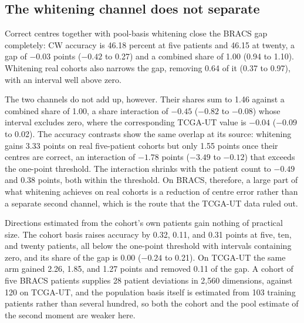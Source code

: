 \documentclass[11pt]{article}
\begin{document}
\subsection{The whitening channel does not separate}
\label{sec:whitening-results}
Correct centres together with pool-basis whitening close the BRACS gap completely: CW accuracy is 46.18 percent at five patients and 46.15 at twenty, a gap of $-0.03$ points ($-0.42$ to 0.27) and a combined share of 1.00 (0.94 to 1.10). Whitening real cohorts also narrows the gap, removing 0.64 of it (0.37 to 0.97), with an interval well above zero.

The two channels do not add up, however. Their shares sum to 1.46 against a combined share of 1.00, a share interaction of $-0.45$ ($-0.82$ to $-0.08$) whose interval excludes zero, where the corresponding TCGA-UT value is $-0.04$ ($-0.09$ to 0.02). The accuracy contrasts show the same overlap at its source: whitening gains 3.33 points on real five-patient cohorts but only 1.55 points once their centres are correct, an interaction of $-1.78$ points ($-3.49$ to $-0.12$) that exceeds the one-point threshold. The interaction shrinks with the patient count to $-0.49$ and 0.38 points, both within the threshold. On BRACS, therefore, a large part of what whitening achieves on real cohorts is a reduction of centre error rather than a separate second channel, which is the route that the TCGA-UT data ruled out.

Directions estimated from the cohort's own patients gain nothing of practical size. The cohort basis raises accuracy by 0.32, 0.11, and 0.31 points at five, ten, and twenty patients, all below the one-point threshold with intervals containing zero, and its share of the gap is 0.00 ($-0.24$ to 0.21). On TCGA-UT the same arm gained 2.26, 1.85, and 1.27 points and removed 0.11 of the gap. A cohort of five BRACS patients supplies 28 patient deviations in 2,560 dimensions, against 120 on TCGA-UT, and the population basis itself is estimated from 103 training patients rather than several hundred, so both the cohort and the pool estimate of the second moment are weaker here.
\end{document}
